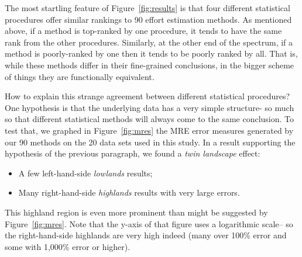 \documentclass{sig-alternate}
\newcommand{\bi}{\begin{itemize}}
\newcommand{\ei}{\end{itemize}}
\newcommand{\fig}[1]{Figure~\ref{fig:#1}}
\begin{document}
The most startling feature of \fig{results} is that four different
statistical procedures offer similar rankings to 90 effort estimation
methods.  As mentioned above, if a method is top-ranked by one procedure,
it tends to have the same rank from the other procedures. Similarly,
at the other end of the spectrum, if a method is poorly-ranked by
one then it tends to be poorly ranked by all.  That is, 
while these methods differ in their fine-grained
conclusions, in the bigger scheme of things they are functionally
equivalent. 

How to explain this strange agreement between different
statistical procedures? One hypothesis is that the underlying data has
a very simple structure- so much so that different statistical methods
will always come to the same conclusion.
To test that, we graphed in \fig{mres} the MRE error measures generated by
our 90 methods on the 20 data sets used in this study.
In a result supporting the hypothesis of the previous paragraph,
we found a {\em twin landscape} effect:
\bi
\item
A few  left-hand-side {\em lowlands} results;
\item
Many  right-hand-side {\em highlands} results with very large errors.
\ei
This  highland region is even more  prominent than might be suggested
by \fig{mres}. Note that the y-axis of that figure uses a logarithmic scale--
so the right-hand-side highlands are very high indeed (many over 100\% error
and some with 1,000\% error or higher).
\end{document}
